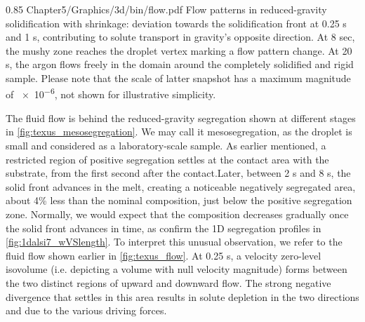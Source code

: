 \begin{figureth}
{0.85}
{Chapter5/Graphics/3d/bin/flow.pdf}
{Flow patterns in reduced-gravity solidification with shrinkage: 
deviation towards the solidification front at 0.25 s and 1 s, contributing to solute transport in gravity's opposite direction.
At 8 sec, the mushy zone reaches the droplet vertex marking a flow pattern change. 
At 20 s, the argon flows freely in the domain around the completely solidified and rigid sample.
Please note that the scale of latter snapshot has a maximum magnitude of \SI{e-6}{\uvelocity}, not shown
for illustrative simplicity.}
\label{fig:texus_flow}
\end{figureth}

The fluid flow is behind the reduced-gravity segregation shown at different stages in \cref{fig:texus_mesosegregation}.
We may call it mesosegregation, as the droplet is small and considered as a laboratory-scale sample.
As earlier mentioned, a restricted region of positive segregation settles at the contact area with the substrate,
from the first second after the contact.Later, between 2 s and 8 s, the solid front advances in the melt, creating 
a noticeable negatively segregated area, about 4\% less than the nominal composition, just below the positive segregation zone.
Normally, we would expect that the composition decreases gradually once the solid front advances in time, as confirm the 1D segregation
profiles in \cref{fig:1dalsi7_wVSlength}. To interpret this unusual observation, we refer to the fluid flow shown earlier in \cref{fig:texus_flow}.
At 0.25 s, a velocity zero-level isovolume (i.e. depicting a volume with null velocity magnitude) forms between the two distinct regions
of upward and downward flow. The strong negative divergence that settles in this area results in solute depletion in the two directions
and due to the various driving forces. 

